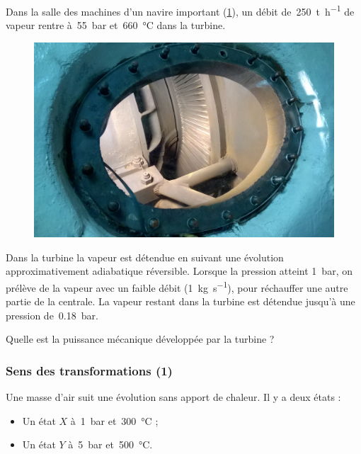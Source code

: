 	Dans la salle des machines d’un navire important (\cref{fig_turbine_uss_hornet}), un débit de~\SI{250}{\tonne\per\hour} de vapeur rentre à~\SI{55}{\bar} et~\SI{660}{\degreeCelsius} dans la turbine.
	
	\begin{figure}[htp] %
		\begin{center}
		\includegraphics[width=\columnwidth]{images/turbine_uss_hornet.jpg}
		\end{center}
		\label{fig_turbine_uss_hornet}
	\end{figure}
	
	Dans la turbine la vapeur est détendue en suivant une évolution approximativement adiabatique réversible. Lorsque la pression atteint \SI{1}{\bar}, on prélève de la vapeur avec un faible débit (\SI{1}{\kilogram\per\second}), pour réchauffer une autre partie de la centrale. La vapeur restant dans la turbine est détendue jusqu’à une pression de~\SI{0,18}{\bar}.
	
	Quelle est la puissance mécanique développée par la turbine ?

\subsubsection{Sens des transformations (1)}
\label{exo_sens_transfos_un}

	Une masse d’air suit une évolution sans apport de chaleur. Il y a deux états :
		\begin{itemize}
			\item Un état $X$ à~\SI{1}{\bar} et~\SI{300}{\degreeCelsius} ;
			\item Un état $Y$ à~\SI{5}{\bar} et~\SI{500}{\degreeCelsius}.
		\end{itemize}
		
